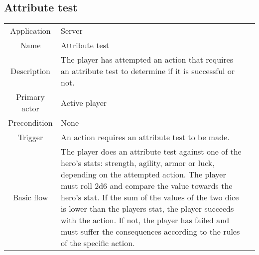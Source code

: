 \subsection{Attribute test}
\label{attributetest}
\begin{tabular}{|c| p{9cm}|c}
\hline
Application & Server \\
Name & Attribute test \\
Description & The player has attempted an action that requires an attribute test to determine if it is successful or not. \\
Primary actor & Active player \\
Precondition & None \\
Trigger & An action requires an attribute test to be made. \\ \hline
Basic flow & The player does an attribute test against one of the hero's stats: strength, agility, armor or luck, depending on the attempted action. The player must roll 2d6 and compare the value towards the hero's stat. If the sum of the values of the two dice is lower than the players stat, the player succeeds with the action. If not, the player has failed and must suffer the consequences according to the rules of the specific action. \\ \hline
\end{tabular}

